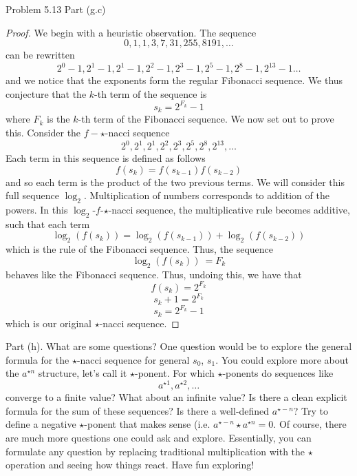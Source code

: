 \begin{sol}{Problem 5.13}
Part (g.c)
\begin{proof}
We begin with a heuristic observation. The sequence
\[
0, 1, 1, 3, 7, 31, 255, 8191, \ldots
\]
can be rewritten
\[
2^0 - 1, 2^1 - 1, 2^1 - 1, 2^2 - 1, 2^3 - 1, 2^5 - 1, 2^8 - 1, 2^{13}-1 \ldots
\]
and we notice that the exponents form the regular Fibonacci sequence. We thus conjecture that the $k$-th term of the sequence is 
\[
s_k = 2^{F_k}-1
\]
where $F_k$ is the $k$-th term of the Fibonacci sequence. We now set out to prove this. Consider the $f-\star$-nacci sequence 
\[
2^0, 2^1, 2^1, 2^2, 2^3, 2^5, 2^8, 2^{13}, \ldots
\]
Each term in this sequence is defined as follows
\[
f(s_k) = f(s_{k-1})f(s_{k-2})
\]
and so each term is the product of the two previous terms. We will consider this full sequence $\log_2$.  Multiplication of numbers corresponds to addition of the powers. In this $\log_2$-$f$-$\star$-nacci sequence, the multiplicative rule becomes additive, such that each term 
\[
\log_2(f(s_k)) = \log_2(f(s_{k-1})) + \log_2(f(s_{k-2}))
\]
which is the rule of the Fibonacci sequence. Thus, the sequence 
\[
\log_2(f(s_{k}))\ = F_k
\]
behaves like the Fibonacci sequence. Thus, undoing this, we have that 
\[
f(s_{k}) = 2^{F_k}
\]
\[
s_k + 1 = 2^{F_k}
\]
\[
s_k = 2^{F_k}-1
\]
which is our original $\star$-nacci sequence.
\end{proof}

Part (h).
What are some questions? One question would be to explore the general formula for the $\star$-nacci sequence for general $s_0$, $s_1$. You could explore more about the $a^{\star n}$ structure, let's call it $\star$-ponent. For which $\star$-ponents do sequences like 
\[
a^{\star1}, a^{\star2}, \ldots
\]
converge to a finite value? What about an infinite value? Is there a clean explicit formula for the sum of these sequences? Is there a well-defined $a^{\star -n}$? Try to define a negative $\star$-ponent that makes sense (i.e. $a^{\star -n} \star a^{\star n} = 0$. Of course, there are much more questions one could ask and explore. Essentially, you can formulate any question by replacing traditional multiplication with the $\star$ operation and seeing how things react. Have fun exploring!
\end{sol}
